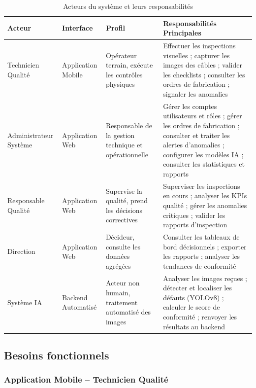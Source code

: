 \begin{table}[H]
\centering
\caption{Acteurs du système et leurs responsabilités}
\label{tab:acteurs}
\renewcommand{\arraystretch}{1.4}
\begin{tabularx}{\textwidth}{|l|l|l|X|}
\hline
\textbf{Acteur} & \textbf{Interface} & \textbf{Profil} & \textbf{Responsabilités Principales} \\
\hline
Technicien Qualité
  & Application Mobile
  & Opérateur terrain, exécute les contrôles physiques
  & Effectuer les inspections visuelles ; capturer les images des câbles ; valider les checklists ; consulter les ordres de fabrication ; signaler les anomalies \\
\hline
Administrateur Système
  & Application Web
  & Responsable de la gestion technique et opérationnelle
  & Gérer les comptes utilisateurs et rôles ; gérer les ordres de fabrication ; consulter et traiter les alertes d'anomalies ; configurer les modèles IA ; consulter les statistiques et rapports \\
\hline
Responsable Qualité
  & Application Web
  & Supervise la qualité, prend les décisions correctives
  & Superviser les inspections en cours ; analyser les KPIs qualité ; gérer les anomalies critiques ; valider les rapports d'inspection \\
\hline
Direction
  & Application Web
  & Décideur, consulte les données agrégées
  & Consulter les tableaux de bord décisionnels ; exporter les rapports ; analyser les tendances de conformité \\
\hline
Système IA
  & Backend Automatisé
  & Acteur non humain, traitement automatisé des images
  & Analyser les images reçues ; détecter et localiser les défauts (YOLOv8) ; calculer le score de conformité ; renvoyer les résultats au backend \\
\hline
\end{tabularx}
\end{table}

\subsection{Besoins fonctionnels}

\subsubsection{Application Mobile – Technicien Qualité}

